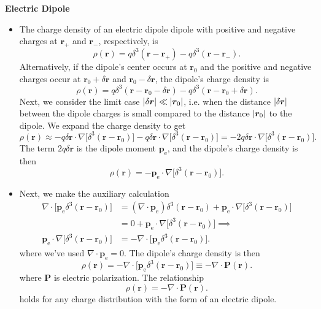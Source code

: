\documentclass[11pt, a4paper]{article}
\renewcommand{\vec}[1]{\bm{#1}} %
\renewcommand{\r}{\vec{r}}
\newcommand{\pe}{\vec{p}_{\text{e}}}  %
\renewcommand{\div}{\nabla \cdot}
\renewcommand{\grad}{\nabla}
\begin{document}
\textbf{Electric Dipole} 
\begin{itemize}
	\item The charge density of an electric dipole dipole with positive and negative charges at $ \r_{+} $ and $ \r_{-} $, respectively, is
	\begin{equation*}
		\rho(\r) = q \delta^{3}(\r - \r_{+}) - q \delta^{3}(\r - \r_{-}).
	\end{equation*}
	Alternatively, if the dipole's center occurs at $ \r_{0} $ and the positive and negative charges occur at $ \r_{0} + \delta \r$ and $ \r_{0} - \delta \r $, the dipole's charge density is
	\begin{equation*}
		\rho(\r) = q \delta^{3}(\r - \r_{0} - \delta \r) - q\delta^{3}(\r - \r_{0} + \delta \r).
	\end{equation*}
	Next, we consider the limit case $ \abs{\delta \r} \ll \abs{\r_{0}} $, i.e. when the distance $ \abs{\delta \vec{r}} $ between the dipole charges is small compared to the distance $ \abs{\vec{r}_{0}} $ to the dipole. We expand the charge density to get
	\begin{equation*}
		\rho(\r) \approx - q \delta \r \cdot \grad \big[\delta^{3}(\r - \r_{0})\big] - q \delta \r \cdot \grad \big[\delta^{3}(\r - \r_{0})\big] = -2 q \delta \r \cdot \grad \big[\delta^{3}(\r - \r_{0})\big].
	\end{equation*}
	The term $ 2q\delta \r $ is the dipole moment $ \pe $, and the dipole's charge density is then
	\begin{equation*}
		\rho(\r) = -\pe \cdot \grad \big[\delta^{3}(\r - \r_{0})\big].
	\end{equation*}

	\item Next, we make the auxiliary calculation
	\begin{align*}
		\div \big[\pe \delta^{3}(\r - \r_{0})\big] &= (\div \pe) \delta^{3}(\r - \r_{0}) + \pe \cdot \grad \big[\delta^{3}(\r - \r_{0})\big] \\
		&= 0 + \pe \cdot \grad \big[\delta^{3}(\r - \r_{0})\big]  \implies \\
		\pe \cdot \grad \big[\delta^{3}(\r - \r_{0})\big]  & = - \div \big[\pe \delta^{3}(\r - \r_{0})\big].
	\end{align*}
	where we've used $ \div \pe = 0 $. The dipole's charge density is then
	\begin{equation*}
		\rho(\r) = - \div \big[\pe \delta^{3}(\r - \r_{0})\big] \equiv - \div \vec{P}(\r).
	\end{equation*}
	where $ \vec{P} $ is electric polarization. The relationship 
	\begin{equation*}
		\rho(\r) = - \div \vec{P}(\r).
	\end{equation*}
	holds for any charge distribution with the form of an electric dipole.
\end{itemize}
\end{document}

